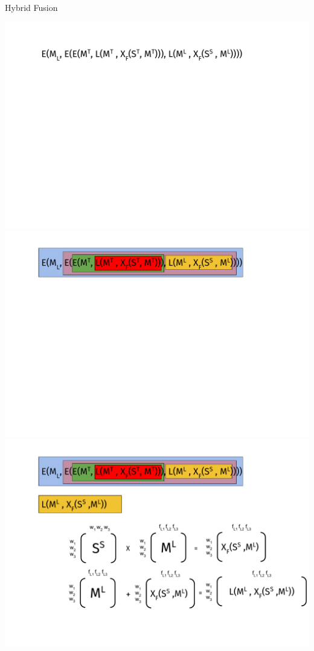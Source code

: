 \documentclass[10pt,xcolor=table]{beamer}
\begin{document}
\begin{frame}{Hybrid Fusion}
\begin{overprint}
	\includegraphics[width=1\linewidth]{image2/Chapitre2/hybrid_fusion0.pdf}%
	\onslide<2>\includegraphics[width=1\linewidth]{image2/Chapitre2/hybrid_fusiona.pdf}%
	\onslide<3>\includegraphics[width=1\linewidth]{image2/Chapitre2/hybrid_fusion1.pdf}%

\end{overprint}
\end{frame}
\end{document}
